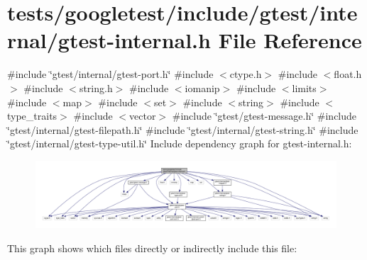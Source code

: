 \hypertarget{gtest-internal_8h}{}\section{tests/googletest/include/gtest/internal/gtest-\/internal.h File Reference}
\label{gtest-internal_8h}
{\ttfamily \#include \char`\"{}gtest/internal/gtest-\/port.\+h\char`\"{}}\newline
{\ttfamily \#include $<$ctype.\+h$>$}\newline
{\ttfamily \#include $<$float.\+h$>$}\newline
{\ttfamily \#include $<$string.\+h$>$}\newline
{\ttfamily \#include $<$iomanip$>$}\newline
{\ttfamily \#include $<$limits$>$}\newline
{\ttfamily \#include $<$map$>$}\newline
{\ttfamily \#include $<$set$>$}\newline
{\ttfamily \#include $<$string$>$}\newline
{\ttfamily \#include $<$type\+\_\+traits$>$}\newline
{\ttfamily \#include $<$vector$>$}\newline
{\ttfamily \#include \char`\"{}gtest/gtest-\/message.\+h\char`\"{}}\newline
{\ttfamily \#include \char`\"{}gtest/internal/gtest-\/filepath.\+h\char`\"{}}\newline
{\ttfamily \#include \char`\"{}gtest/internal/gtest-\/string.\+h\char`\"{}}\newline
{\ttfamily \#include \char`\"{}gtest/internal/gtest-\/type-\/util.\+h\char`\"{}}\newline
Include dependency graph for gtest-\/internal.h\+:\nopagebreak
\begin{figure}[H]
\begin{center}
\leavevmode
\includegraphics[width=350pt]{gtest-internal_8h__incl}
\end{center}
\end{figure}
This graph shows which files directly or indirectly include this file\+:\nopagebreak
